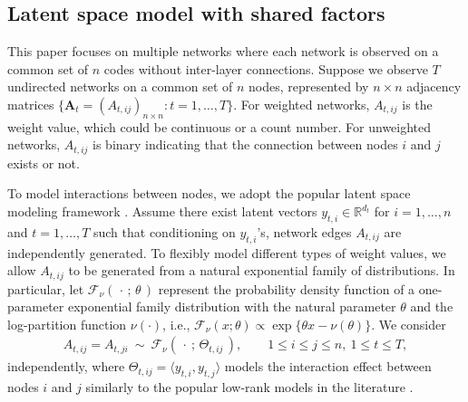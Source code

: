 \documentclass[12pt]{article}
\begin{document}
\subsection{Latent space model with shared factors}

This paper focuses on  multiple networks where each network is observed on a common set of $n$ codes without inter-layer connections. 
Suppose we observe $T$ undirected networks on a common set of $n$ nodes, represented by $n\times n$ adjacency  matrices $\{\mathbf{A}_t = (A_{t,ij})_{n\times n} : t=1,\ldots, T\}$. 
For weighted networks, $A_{t,ij}$ is the weight value, which could be continuous or a count number. For unweighted networks, $A_{t,ij}$ is binary indicating that the connection between nodes $i$ and $j$ exists or not.  

To model interactions between nodes, 
we adopt the popular latent space modeling framework \citep{hoff2002latent}. Assume there exist latent vectors $y_{t,i} \in \mathbb{R}^{d_t}$ for $i=1,\ldots, n$ and $t=1,\ldots, T$ such that conditioning on $y_{t,i}$'s, network edges $A_{t,ij}$ are independently generated.
To flexibly model different types of weight values, 
we allow   $A_{t,ij}$ to be generated from  a natural  exponential  family of distributions.
In particular, let $\mathcal{F}_{\nu}(\, \cdot \, ;\, \theta \, )$ represent the probability density function of  a one-parameter exponential family distribution with the natural
parameter $\theta$ and the log-partition function $\nu(\cdot)$, i.e., $\mathcal{F}_{\nu}(x ; \theta  ) \propto \exp\{\theta x - \nu(\theta)\}$.  
We consider  
\begin{align} \label{eq:model}
    A_{t,ij} = A_{t,ji}\ \sim  \  \mathcal{F}_{\nu}(\, \cdot \ ; \, \Theta_{t,ij} \,), \quad \quad 1 \leqslant i \leqslant j \leqslant n,\ 1 \leqslant t \leqslant T,
\end{align} 
independently, 
where 
$\Theta_{t,ij}=\langle y_{t,i},y_{t,j} \rangle $ models the interaction effect between nodes $i$ and $j$ similarly to the popular low-rank  models in the literature \citep{hoff2002latent,ma2020universal}. 
\end{document}
